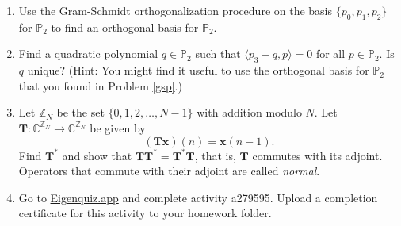 \documentclass[12pt]{amsart}
\newcommand{\1}{\mathbbm{1}}
\numberwithin{equation}{section}
\numberwithin{Theorem}{section}
\theoremstyle{plain} %
\theoremstyle{definition}
\theoremstyle{remark}
\begin{document}
\begin{enumerate}[1.]
\begin{enumerate}[(a)]
\end{enumerate}\bigskip



\item\label{gsp} Use the Gram-Schmidt orthogonalization procedure on the basis \(\{p_{0},p_{1},p_{2}\}\) for \(\mathbb{P}_{2}\) to find an orthogonal basis for \(\mathbb{P}_{2}\).\bigskip

\item Find a quadratic polynomial \(q\in\mathbb{P}_{2}\) such that \(\langle p_{3}-q,p\rangle = 0\) for all \(p\in\mathbb{P}_{2}\). Is \(q\) unique? (Hint: You might find it useful to use the orthogonal basis for \(\mathbb{P}_{2}\) that you found in Problem \ref{gsp}.) \bigskip

\item Let \(\mathbb{Z}_{N}\) be the set \(\{0,1,2,\ldots,N-1\}\) with addition modulo \(N\). Let \(\mathbf{T}:\mathbb{C}^{\mathbb{Z}_{N}}\to\mathbb{C}^{\mathbb{Z}_{N}}\) be given by \[(\mathbf{Tx})(n) = \mathbf{x}(n-1).\]
Find \(\mathbf{T}^{\ast}\) and show that \(\mathbf{TT}^{\ast}=\mathbf{T}^{\ast}\mathbf{T}\), that is, \(\mathbf{T}\) commutes with its adjoint. Operators that commute with their adjoint are called \textit{normal}.\bigskip





\item Go to \href{https://eigenquiz.app/}{Eigenquiz.app} and complete activity a279595. Upload a completion certificate for this activity to your homework folder.

\end{enumerate}
\end{document}
